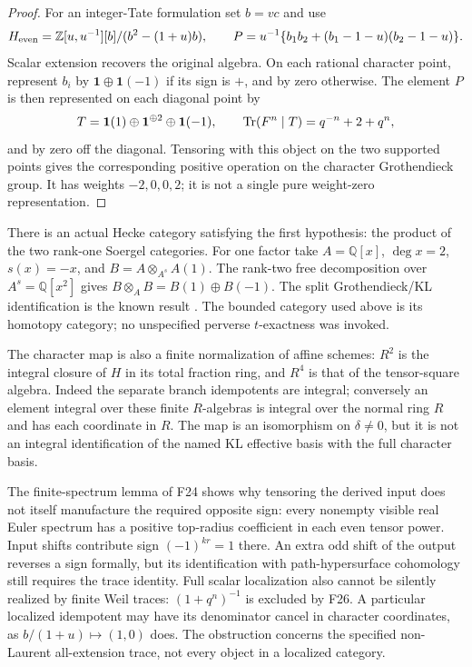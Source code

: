 \documentclass[11pt,a4paper]{article}
\newcommand{\Q}{\mathbb Q}\newcommand{\Z}{\mathbb Z}\newcommand{\C}{\mathbb C}\newcommand{\N}{\mathbb N}\newcommand{\F}{\mathbb F}
\renewcommand{\S}{\ensuremath{\mathsection}}
\newcommand{\fid}[1]{\textsf{#1}}\newcommand{\gate}[1]{\textsf{#1}}
\theoremstyle{named}\newtheorem{finding}{Finding}[section]
\theoremstyle{definition}\newtheorem{definition}[finding]{Definition}
\theoremstyle{remark}\newtheorem{remark}[finding]{Remark}
\begin{document}
\begin{proof}
For an integer-Tate formulation set $b=vc$ and use
\[
 H_{\rm even}=\Z[u,u^{-1}][b]/(b^2-(1+u)b),\qquad
 P=u^{-1}\{b_1b_2+(b_1-1-u)(b_2-1-u)\}.
\]
Scalar extension recovers the original algebra. On each rational
character point, represent $b_i$ by $\mathbf1\oplus\mathbf1(-1)$
if its sign is $+$, and by zero otherwise. The element $P$ is then
represented on each diagonal point by
\[
 T=\mathbf1(1)\oplus\mathbf1^{\oplus2}\oplus\mathbf1(-1),
 \qquad \operatorname{Tr}(F^n\mid T)=q^{-n}+2+q^n,
\]
and by zero off the diagonal. Tensoring with this object on the
two supported points gives the corresponding positive operation on
the character Grothendieck group. It has weights $-2,0,0,2$;
it is not a single pure weight-zero representation.
\end{proof}

There is an actual Hecke category satisfying the first hypothesis:
the product of the two rank-one Soergel categories. For one factor
take $A=\Q[x]$, $\deg x=2$, $s(x)=-x$, and
$B=A\otimes_{A^s}A(1)$. The rank-two free decomposition over
$A^s=\Q[x^2]$ gives $B\otimes_A B=B(1)\oplus B(-1)$.
The split Grothendieck/KL identification is the known result
\cite[\S3.5, Theorem~3.5, pp.~1107--1108; Theorem~1.1, p.~1093]{EW}.
The bounded category used above is its homotopy category; no
unspecified perverse $t$-exactness was invoked.

The character map is also a finite normalization of affine schemes:
$R^2$ is the integral closure of $H$ in its total fraction ring,
and $R^4$ is that of the tensor-square algebra. Indeed the separate
branch idempotents are integral; conversely an element integral over
these finite $R$-algebras is integral over the normal ring $R$ and
has each coordinate in $R$. The map is an isomorphism on
$\delta\ne0$, but it is not an integral identification of the named
KL effective basis with the full character basis.

The finite-spectrum lemma of \fid{F24} shows why tensoring the
derived input does not itself manufacture the required opposite sign:
every nonempty visible real Euler spectrum has a positive top-radius
coefficient in each even tensor power. Input shifts contribute sign
$(-1)^{kr}=1$ there. An extra odd shift of the output reverses a sign
formally, but its identification with path-hypersurface cohomology
still requires the trace identity. Full scalar localization also
cannot be silently realized by finite Weil traces:
$(1+q^n)^{-1}$ is excluded by \fid{F26}. A particular localized
idempotent may have its denominator cancel in character coordinates,
as $b/(1+u)\mapsto(1,0)$ does. The obstruction concerns the specified
non-Laurent all-extension trace, not every object in a localized
category.
\end{document}
